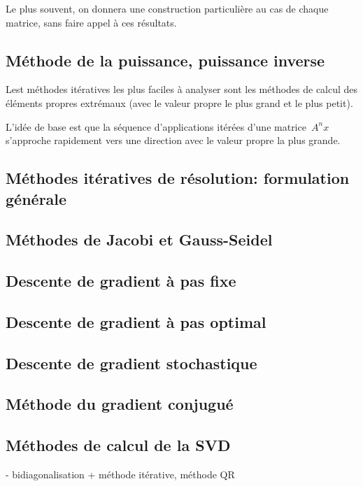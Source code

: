 Le plus souvent, on donnera une construction particulière au cas de chaque
matrice, sans faire appel à ces résultats.


\subsection{Méthode de la puissance, puissance inverse}

Lest méthodes itératives les plus faciles à analyser sont les méthodes de
calcul des éléments propres extrémaux (avec le valeur propre le plus grand et
le plus petit).

L'idée de base est que la séquence d'applications itérées d'une
matrice~$A^nx$ s'approche rapidement vers une direction avec le valeur
propre la plus grande.

\subsection{Méthodes itératives de résolution: formulation générale}

\subsection{Méthodes de Jacobi et Gauss-Seidel}

\subsection{Descente de gradient à pas fixe}

\subsection{Descente de gradient à pas optimal}

\subsection{Descente de gradient stochastique}

\subsection{Méthode du gradient conjugué}

\subsection{Méthodes de calcul de la SVD}

- bidiagonalisation + méthode itérative, méthode QR

